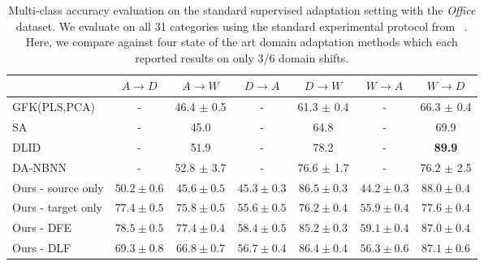 \begin{table*}
  \setlength{\tabcolsep}{4pt}
  \small
\centering
\begin{tabular}{lcccccc}
\toprule
                     & $A \rightarrow D$   & $A \rightarrow W$   & $D \rightarrow A$   & $D \rightarrow W$   & $W \rightarrow A$   & $W \rightarrow D$   \\
\midrule
GFK(PLS,PCA)~\cite{gong-cvpr12} & - & 46.4 $\pm$ 0.5 & - & 61.3 $\pm$ 0.4 & - & 66.3 $\pm$ 0.4\\
SA~\cite{fernando-iccv13} & - & 45.0 & - & 64.8 & - & 69.9\\
DLID~\cite{ref:dlid} & - & 51.9 & - & 78.2 & - & \bf{89.9}\\     
DA-NBNN~\cite{da-nbnn} & - & 52.8 $\pm$ 3.7 & - & 76.6 $\pm$ 1.7 &           - & 76.2 $\pm$ 2.5\\
\midrule
 Ours - source only   & $50.2 \pm 0.6$     & $45.6 \pm 0.5$     & $45.3 \pm 0.3$     & $\bm{86.5 \pm 0.3}$     & $44.2 \pm 0.3$     & $88.0 \pm 0.4$     \\
 Ours - target only   & $77.4 \pm 0.5$     & $75.8 \pm 0.5$     & $55.6 \pm 0.5$     & $76.2 \pm 0.4$     & $55.9 \pm 0.4$     & $77.6 \pm 0.4$     \\
Ours - DFE & $\bm{78.5 \pm 0.5}$     & $\bm{77.4 \pm 0.4}$     & $\bm{58.4 \pm 0.5}$     & $85.2 \pm 0.3$     & $\bm{59.1 \pm 0.4}$     & $87.0 \pm 0.4$     \\
Ours - DLF& $69.3 \pm 0.8$ & $66.8 \pm 0.7$ & $56.7 \pm 0.4$ & $86.4 \pm 0.4$ & $56.3 \pm 0.6$ & $87.1 \pm 0.6$ \\
\bottomrule
\end{tabular}

\caption{Multi-class accuracy evaluation on the standard supervised adaptation setting with the \emph{Office} dataset. We evaluate on all 31 categories using the standard experimental protocol from ~\cite{saenko-eccv10}. Here, we compare against four state of the art domain adaptation methods which each reported results on only 3/6 domain shifts.}
\label{table:full-semi}
\end{table*}

